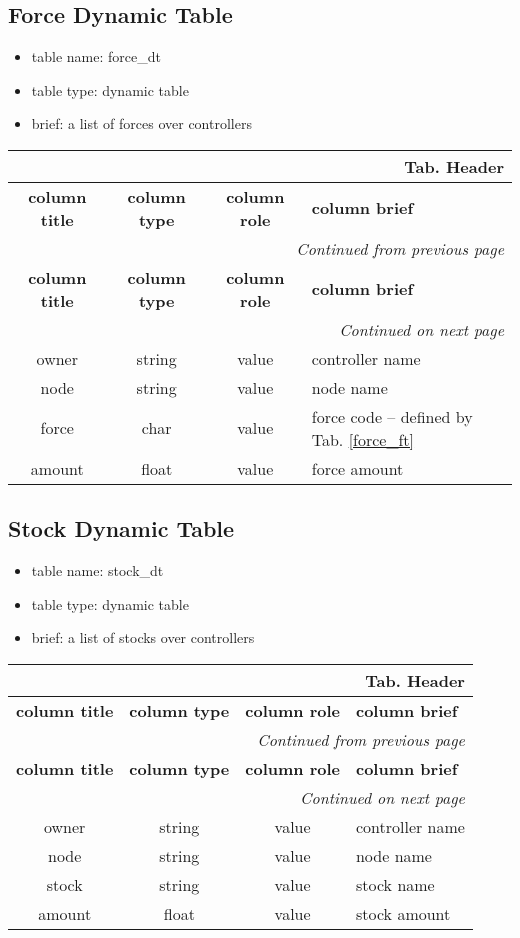 \documentclass[a4paper,oneside,titlepage]{report}
\newcommand*{\LTHeaderIV}[5]{
  \multicolumn{4}{r}{\textbf{Tab. \thesubsection} \textbf{#1}}\\    
  \hline
  \textbf{#2} & \textbf{#3} & \textbf{#4} & \textbf{#5}\\
  \hline
  
  \endfirsthead
  \multicolumn{4}{r}{\textit{Continued from previous page}}\\    
  \hline
  \textbf{#2} & \textbf{#3} & \textbf{#4} & \textbf{#5}\\
  \hline
  \endhead
  \hline
  \multicolumn{4}{r}{\textit{Continued on next page}}\\
  \endfoot
  \hline
  \endlastfoot  
}
\begin{document}
\subsection{Force Dynamic Table}
\begin{itemize}
  \setlength{\itemsep}{0pt}
  \setlength{\parskip}{0pt}
\item table name: force\_dt  
\item table type: dynamic table   
\item brief: a list of forces over controllers
\end{itemize}

\vspace{-0.5cm}
\begin{longtable}{ |c|c|c|l| } 
  \LTHeaderIV{Header}{column title}{column type}{column role}{column brief}                    
  owner & string & value & controller name\\
  node & string & value & node name\\
  force & char & value & force code -- defined by Tab. \ref{force_ft}\\
  amount & float & value & force amount\\
\end{longtable}        

\subsection{Stock Dynamic Table}
\begin{itemize}
  \setlength{\itemsep}{0pt}
  \setlength{\parskip}{0pt}
\item table name: stock\_dt  
\item table type: dynamic table   
\item brief: a list of stocks over controllers
\end{itemize}

\vspace{-0.5cm}
\begin{longtable}{ |c|c|c|l| } 
  \LTHeaderIV{Header}{column title}{column type}{column role}{column brief}                    
  owner & string & value & controller name\\
  node & string & value & node name\\
  stock & string & value & stock name\\
  amount & float & value & stock amount\\
\end{longtable}        
\end{document}
